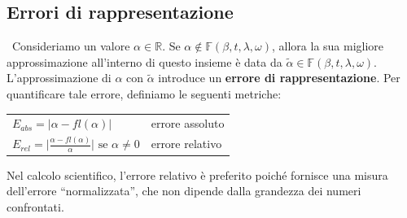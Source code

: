\documentclass{article}
\begin{document}
\subsection{Errori di rappresentazione}
\begin{definition}\leavevmode\
    Consideriamo un valore $\alpha\in \mathbb{R}$. Se $\alpha\notin
    \mathbb{F}(\beta,t,\lambda,\omega)$, allora la sua migliore
    approssimazione all'interno di questo insieme è data da $\tilde\alpha\in
    \mathbb{F}(\beta,t,\lambda,\omega)$. L'approssimazione di $\alpha$ con
    $\tilde\alpha$ introduce un \textbf{errore di rappresentazione}. Per quantificare
    tale errore, definiamo le seguenti metriche:
    {
        \renewcommand{\arraystretch}{1.5}
        \begin{center}
           \begin{tabular}{ll}
                $E_{abs}=\lvert \alpha-fl(\alpha)\rvert$ & errore assoluto \\
                $E_{rel}=\lvert \frac{\alpha-fl(\alpha)}{\alpha}\rvert\text{ se
            }\alpha\neq0$ & errore relativo 
           \end{tabular}
        \end{center}
    }
\end{definition}
Nel calcolo scientifico, l'errore relativo è preferito poiché fornisce una
misura dell'errore ``normalizzata'', che non dipende dalla grandezza dei numeri confrontati.
\end{document}

